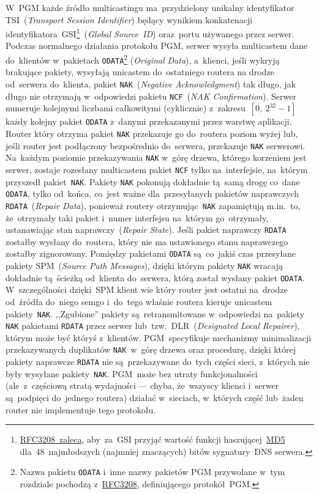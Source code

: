 \documentclass[thesis]{subfiles}
\begin{document}
W~PGM każde źródło multicastingu ma~przydzielony unikalny identyfikator TSI~(\emph{Transport Session Identifier}) będący wynikiem konkatenacji identyfikatora~GSI\footnote{\href{https://tools.ietf.org/html/rfc3208\#page-33}{RFC3208~zaleca}, aby~za~GSI przyjąć wartość funkcji haszującej~\href{https://en.wikipedia.org/wiki/MD5}{MD5} dla~48~najmłodszych (najmniej znaczących) bitów sygnatury~DNS serwera.}~(\emph{Global Source~ID}) oraz~portu używanego przez serwer. Podczas normalnego działania protokołu PGM, serwer wysyła multicastem dane do~klientów w~pakietach \texttt{ODATA}\footnote{Nazwa pakietu \texttt{ODATA} i~inne nazwy pakietów PGM przywołane w~tym rozdziale pochodzą z~\href{https://tools.ietf.org/html/rfc3208}{RFC3208}, definiującego protokół~PGM.} (\emph{Original Data}), a~klienci, jeśli wykryją brakujące pakiety, wysyłają unicastem do~ostatniego routera na drodze od~serwera do~klienta, pakiet \texttt{NAK}~(\emph{Negative Acknowledgment}) tak długo, jak długo nie otrzymają w~odpowiedzi pakietu \texttt{NCF}~(\emph{NAK Confirmation}). Serwer numeruje kolejnymi liczbami całkowitymi (cyklicznie) z~zakresu~$[0,~2^{32}-1]$ każdy kolejny pakiet \texttt{ODATA} z~danymi przekazanymi przez warstwę aplikacji. Router który otrzyma pakiet \texttt{NAK} przekazuje go do~routera poziom wyżej lub, jeśli router jest podłączony bezpośrednio do~serwera, przekazuje \texttt{NAK} serwerowi. Na~każdym poziomie przekazywania \texttt{NAK} w~górę drzewa, którego korzeniem jest serwer, zostaje rozesłany multicastem pakiet \texttt{NCF} tylko na~interfejsie, na~którym przyszedł pakiet~\texttt{NAK}. Pakiety \texttt{NAK} pokonują dokładnie tą~samą drogę co~dane \texttt{ODATA}, tylko od~końca, co~jest ważne dla~przesyłanych pakietów naprawczych \texttt{RDATA}~(\emph{Repair Data}), ponieważ routery otrzymując~\texttt{NAK} zapamiętują m.in.~to, że~otrzymały taki pakiet i~numer interfejsu na~którym go~otrzymały, ustanawiając stan naprawczy~(\emph{Repair State}). Jeśli pakiet naprawczy \texttt{RDATA} zostałby wysłany do~routera, który nie ma ustawionego stanu naprawczego zostałby zignorowany. Pomiędzy pakietami \texttt{ODATA} są~co~jakiś czas przesyłane pakiety SPM~(\emph{Source Path Messages}), dzięki którym pakiety \texttt{NAK} wracają dokładnie tą~ścieżką od~klienta do~serwera, którą został wysłany pakiet \texttt{ODATA}. W~szczególności dzięki~SPM klient wie który router jest ostatni na~drodze od~źródła do~niego semgo i~do~tego właśnie routera kieruje unicastem pakiety~\texttt{NAK}. ,,Zgubione'' pakiety są~retransmitowane w~odpowiedzi na~pakiety \texttt{NAK} pakietami \texttt{RDATA} przez serwer lub~tzw.~DLR~(\emph{Designated Local Repairer}), którym może być któryś z~klientów. PGM~specyfikuje mechanizmy minimalizacji przekazywanych duplikatów \texttt{NAK}~w~górę drzewa oraz procedurę, dzięki której pakiety naprawcze \texttt{RDATA} nie są~przekazywane do~tych części sieci, z~których nie były wysyłane pakiety~\texttt{NAK}. PGM~może bez utraty funkcjonalności (ale~z~częściową stratą wydajności --- chyba, że~wszyscy klienci i~serwer są~podpięci do~jednego routera) działać w~sieciach, w~których część lub~żaden router nie implementuje tego protokołu.
\end{document}
